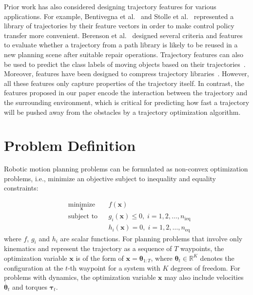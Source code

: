 \documentclass[letterpaper, 10 pt, conference]{ieeeconf}  %
\newcommand{\x}{\mbox{$\mathbf x$}}
\newcommand{\btheta}{\mbox{$\bm \theta$}}
\begin{document}
Prior work has also considered designing trajectory features for various applications. For example, Bentivegna et al.~\cite{Bentivegna:2006:LST} and Stolle et al.~\cite{Stolle:2007:TPT} represented a library of trajectories by their feature vectors in order to make control policy transfer more convenient. 
Berenson et al.~\cite{Berenson:2012:RPP} designed several criteria and features to evaluate 
whether a trajectory from a path library is likely to be reused in a new planning scene after suitable repair operations. Trajectory features can also be used to predict the class labels of moving objects based on their trajectories~\cite{Lee:2008:TTC}. Moreover, features have been designed to compress trajectory libraries~\cite{Arikan:2006:CMC}. However, all these features only capture properties of the trajectory itself. In contrast, the features proposed in our paper encode the interaction between the trajectory and the surrounding environment, which is critical for predicting how fast a trajectory will be pushed away from the obstacles by a trajectory optimization algorithm.




\section{Problem Definition}
\label{sec:probstatement}

Robotic motion planning problems can be formulated as non-convex optimization problems, i.e., minimize an objective subject to inequality and equality constraints:

\begin{equation*}
\begin{aligned}
& \underset{\x}{\text{minimize}}
& & f(\x) \\
& \text{subject to}
& & g_i(\x) \leq 0, \; i = 1, 2, \dots, n_{\text{ieq}} \\
&&& h_i(\x) = 0, \; i = 1, 2, \dots, n_{\text{eq}}
\end{aligned}
\end{equation*}
where $f$, $g_i$ and $h_i$ are scalar functions. For planning problems that involve only kinematics and represent the trajectory as a sequence of $T$ waypoints, the optimization variable $\x$ is of the form of $\x = \btheta_{1:T}$, where $\btheta_t \in \mathbb{R}^K$ denotes the configuration at the $t$-th waypoint for a system with $K$ degrees of freedom. For problems with dynamics, the optimization variable $\x$ may also include velocities $\dot{\btheta_t}$ and torques ${\bm \tau}_t$.
\end{document}
